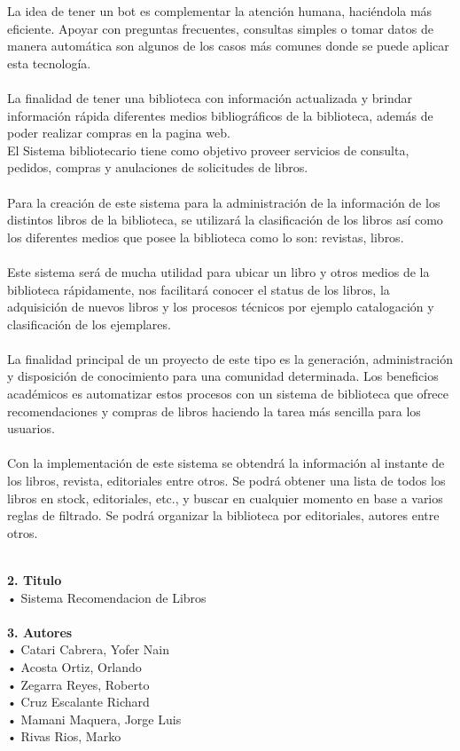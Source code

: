 \begin{flushleft}
\begin{itemize}
La idea de tener un bot es complementar la atención humana, haciéndola más eficiente. Apoyar con preguntas frecuentes, consultas simples o tomar datos de manera automática son algunos de los casos más comunes donde se puede aplicar esta tecnología.\textbf{ }\\
\textbf{ }\\
La finalidad de tener una biblioteca con información actualizada y brindar información rápida diferentes medios bibliográficos de la biblioteca, además de poder realizar compras en la pagina web.\textbf{ }\\
El Sistema bibliotecario tiene como objetivo proveer servicios de consulta, pedidos, compras y anulaciones de solicitudes de libros.
\textbf{ }\\
\textbf{ }\\
Para la creación de este sistema para la administración de la información de los distintos libros de la biblioteca, se utilizará la clasificación de los libros así como los diferentes medios que posee la biblioteca como lo son: revistas, libros.
 \textbf{ }\\
\textbf{ }\\
Este sistema será de mucha utilidad para ubicar un libro y otros medios de la biblioteca rápidamente, nos facilitará conocer el status de los libros, la adquisición de nuevos libros y los procesos técnicos por ejemplo catalogación y clasificación de los ejemplares.
\textbf{ }\\
\textbf{ }\\
La finalidad principal de un proyecto de este tipo es la generación, administración y disposición de conocimiento para una comunidad determinada.
Los beneficios académicos es automatizar estos procesos con un sistema de biblioteca que ofrece recomendaciones y compras de libros haciendo la tarea más sencilla para los usuarios.
\textbf{ }\\
\textbf{ }\\
Con la implementación de este sistema se obtendrá la información al instante de los libros, revista, editoriales entre otros. Se podrá obtener una lista de todos los libros en stock, editoriales, etc., y buscar en cualquier momento en base a varios reglas de filtrado. Se podrá organizar la biblioteca por editoriales, autores entre otros.


\textbf{ }\\
\textbf{2.	Titulo}\\
•         Sistema Recomendacion de Libros
\textbf{ }\\
\textbf{ }\\
\textbf{3.	Autores}\\
•	Catari Cabrera, Yofer Nain\textbf{ }\\
•	Acosta Ortiz, Orlando \textbf{ }\\
•	Zegarra Reyes, Roberto\textbf{ }\\
•	Cruz Escalante Richard\textbf{ }\\
•	Mamani Maquera, Jorge Luis\textbf{ }\\
•	Rivas Rios, Marko\textbf{ }\\



\end{itemize}
\end{flushleft}
